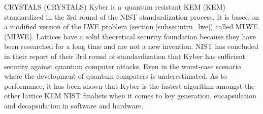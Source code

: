 CRYSTALS (\acl{CRYSTALS}) Kyber is a~quantum resistant KEM (\acl{KEM}) standardized in the 3rd round of the NIST standardization process. It is based on a modified version of the LWE problem (section \ref{subsec:ntru_lwe}) called MLWE (\acl{MLWE}). Lattices have a solid theoretical security foundation because they have been researched for a long time and are not a new invention. NIST has concluded in their report of their 3rd round of standardization that Kyber has sufficient security against quantum computer attacks. Even in the worst-case scenario where the development of quantum computers is underestimated. As to performance, it has been shown that Kyber is the fastest algorithm amongst the other lattice KEM NIST finalists when it comes to key generation, encapsulation and decapsulation in software and hardware. \cite{Grimes2020}\cite{Alagic2022}
